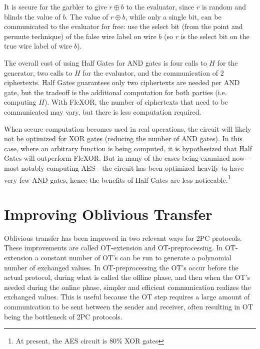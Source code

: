It is secure for the garbler to give $r \oplus b$ to the evaluator, since $r$ is random and blinds the value of $b$. 
The value of $r \oplus b$, while only a single bit, can be communicated to the evaluator for free: use the select bit (from the point and permute technique) of the false wire label on wire $b$ (so $r$ is the select bit on the true wire label of wire $b$).

The overall cost of using Half Gates for AND gates is four calls to $H$ for the generator, two calls to $H$ for the evaluator, and the communication of $2$ ciphertexts. 
Half Gates guarantees only two ciphertexts are needed per AND gate, but the tradeoff is the additional computation for both parties (i.e. computing $H$).
With FleXOR, the number of ciphertexts that need to be communicated may vary, but there is less computation required.

When secure computation becomes used in real operations, the circuit will likely not be optimized for XOR gates (reducing the number of AND gates). 
In this case, where an arbitrary function is being computed, it is hypothesized that Half Gates will outperform FleXOR. 
But in many of the cases being examined now - most notably computing AES - the circuit has been optimized heavily to have very few AND gates, hence the benefits of Half Gates are less noticeable.\footnote{At present, the AES circuit is 80\% XOR gates} 

\section{Improving Oblivious Transfer}
Oblivious transfer has been improved in two relevant ways for 2PC protocols. 
These improvements are called OT-extension and OT-preprocessing. 
In OT-extension a constant number of OT's can be run to generate a polynomial number of exchanged values.
In OT-preprocessing the OT's occur before the actual protocol, during what is called the offline phase, and then when the OT's needed during the online phase, simpler and efficient communication realizes the exchanged values.
This is useful because the OT step requires a large amount of communication to be sent between the sender and receiver, often resulting in OT being the bottleneck of 2PC protocols.

